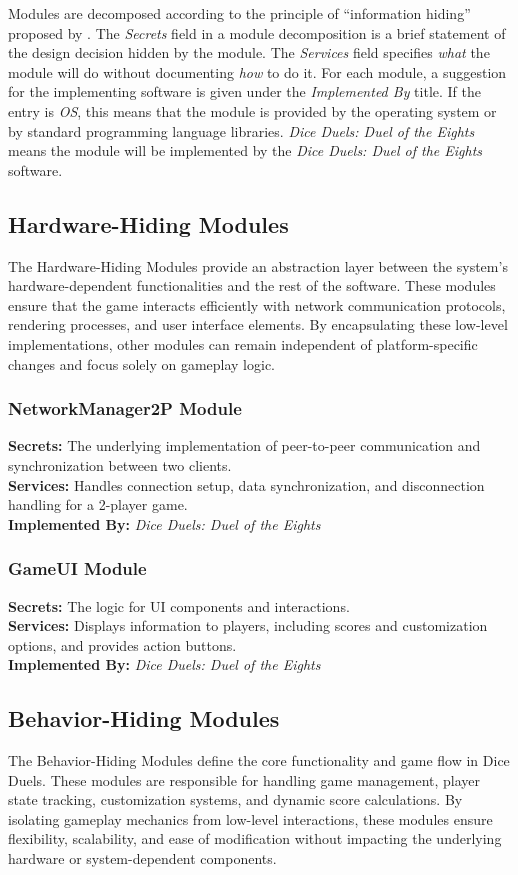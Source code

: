 \documentclass[12pt, titlepage]{article}
\begin{document}
Modules are decomposed according to the principle of ``information hiding''
proposed by \citet{ParnasEtAl1984}. The \emph{Secrets} field in a module
decomposition is a brief statement of the design decision hidden by the
module. The \emph{Services} field specifies \emph{what} the module will do
without documenting \emph{how} to do it. For each module, a suggestion for the
implementing software is given under the \emph{Implemented By} title. If the
entry is \emph{OS}, this means that the module is provided by the operating
system or by standard programming language libraries.  \emph{\textit{Dice Duels: Duel of the Eights}} means the
module will be implemented by the \textit{Dice Duels: Duel of the Eights} software.

\subsection{Hardware-Hiding Modules}
The Hardware-Hiding Modules provide an abstraction layer between the system's hardware-dependent functionalities and the rest of the software. These modules ensure that the game interacts efficiently with network communication protocols, rendering processes, and user interface elements. By encapsulating these low-level implementations, other modules can remain independent of platform-specific changes and focus solely on gameplay logic.
\subsubsection{NetworkManager2P Module}
\textbf{Secrets:} The underlying implementation of peer-to-peer communication and synchronization between two clients.\\
\textbf{Services:} Handles connection setup, data synchronization, and disconnection handling for a 2-player game.\\
\textbf{Implemented By:} \textit{Dice Duels: Duel of the Eights}

\subsubsection{GameUI Module}
\textbf{Secrets:} The logic for UI components and interactions.\\
\textbf{Services:} Displays information to players, including scores and customization options, and provides action buttons.\\
\textbf{Implemented By:} \textit{Dice Duels: Duel of the Eights}

\subsection{Behavior-Hiding Modules}
The Behavior-Hiding Modules define the core functionality and game flow in Dice Duels. These modules are responsible for handling game management, player state tracking, customization systems, and dynamic score calculations. By isolating gameplay mechanics from low-level interactions, these modules ensure flexibility, scalability, and ease of modification without impacting the underlying hardware or system-dependent components.
\end{document}
